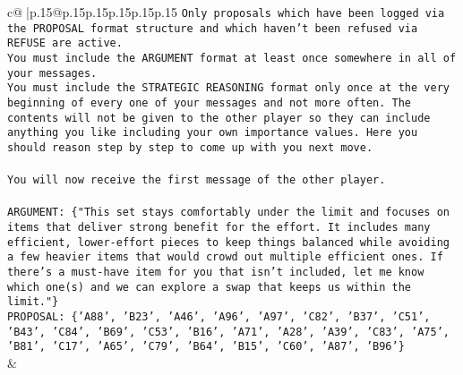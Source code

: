 \documentclass{article}
\begin{document}
{\begin{supertabular}{c@{$\;$}|p{.15\linewidth}@{}p{.15\linewidth}p{.15\linewidth}p{.15\linewidth}p{.15\linewidth}p{.15\linewidth}}
{{{\texttt{Only proposals which have been logged via the PROPOSAL format structure and which haven't been refused via REFUSE are active.} \\
\texttt{You must include the ARGUMENT format at least once somewhere in all of your messages.} \\
\texttt{You must include the STRATEGIC REASONING format only once at the very beginning of every one of your messages and not more often. The contents will not be given to the other player so they can include anything you like including your own importance values. Here you should reason step by step to come up with you next move.} \\
\\ 
\texttt{You will now receive the first message of the other player.} \\
\\ 
\texttt{ARGUMENT: \{"This set stays comfortably under the limit and focuses on items that deliver strong benefit for the effort. It includes many efficient, lower{-}effort pieces to keep things balanced while avoiding a few heavier items that would crowd out multiple efficient ones. If there’s a must{-}have item for you that isn’t included, let me know which one(s) and we can explore a swap that keeps us within the limit."\}} \\
\texttt{PROPOSAL: \{'A88', 'B23', 'A46', 'A96', 'A97', 'C82', 'B37', 'C51', 'B43', 'C84', 'B69', 'C53', 'B16', 'A71', 'A28', 'A39', 'C83', 'A75', 'B81', 'C17', 'A65', 'C79', 'B64', 'B15', 'C60', 'A87', 'B96'\}} \\
            }
        }
    }
    & \\ \\


\end{supertabular}}
\end{document}
